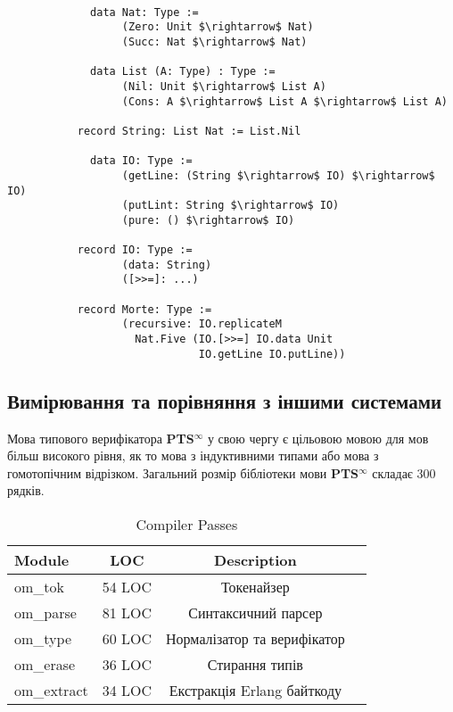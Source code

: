 \documentclass{article}
\begin{document}
\begin{lstlisting}[mathescape=true]

             data Nat: Type :=
                  (Zero: Unit $\rightarrow$ Nat)
                  (Succ: Nat $\rightarrow$ Nat)

             data List (A: Type) : Type :=
                  (Nil: Unit $\rightarrow$ List A)
                  (Cons: A $\rightarrow$ List A $\rightarrow$ List A)

           record String: List Nat := List.Nil

             data IO: Type :=
                  (getLine: (String $\rightarrow$ IO) $\rightarrow$ IO)
                  (putLint: String $\rightarrow$ IO)
                  (pure: () $\rightarrow$ IO)

           record IO: Type :=
                  (data: String)
                  ([>>=]: ...)

           record Morte: Type :=
                  (recursive: IO.replicateM
                    Nat.Five (IO.[>>=] IO.data Unit
                              IO.getLine IO.putLine))

\end{lstlisting}

\subsection{Вимірювання та порівняння з іншими системами}
Мова типового верифікатора \textbf{PTS$^\infty$} у свою чергу є цільовою мовою
для мов більш високого рівня, як то мова з індуктивними типами або мова з гомотопічним відрізком.
Загальний розмір бібліотеки мови \textbf{PTS$^\infty$} складає 300 рядків.

\begin{table}[h]
\begin{center}
\caption{Compiler Passes}
\label{tab:passes}
\begin{tabular}{lccc}
\hline
{\bf Module} & {\bf LOC} & {\bf Description}\\
\hline
om\_tok     & 54 LOC & Токенайзер\\
om\_parse   & 81 LOC & Синтаксичний парсер\\
om\_type    & 60 LOC & Нормалізатор та верифікатор\\
om\_erase   & 36 LOC & Стирання типів\\
om\_extract & 34 LOC & Екстракція Erlang байткоду\\
\hline
\end{tabular}
\end{center}
\end{table}
\end{document}
